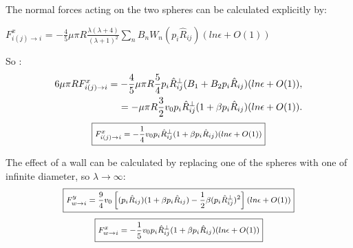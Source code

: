 \documentclass{article}
\begin{document}
The normal forces acting on the two spheres can be calculated explicitly by\cite{Brumley}:
\begin{center}
    $F_{i(j)\rightarrow i}^{x}$ = $-\frac{4}{5} \mu \pi R \frac{\lambda(\lambda +4)}{(\lambda +1)^2} \sum_{n} B_n W_n(p_i\hat{R}_{ij}) (ln \epsilon + O(1))$
\end{center}
 So :
\begin{align*}
    \footnotesize
    6\mu\pi RF_{i(j)\rightarrow i}^{x} = -\frac{4}{5}\mu\pi R\frac{5}{4}p_i\hat{R}^{\perp}_{ij}(B_1 + B_2 p_i\hat{R}_{ij})(ln \epsilon + O(1)),\\
    = -\mu\pi R\frac{3}{2}v_0p_i\hat{R}^{\perp}_{ij}(1 + \beta p_i\hat{R}_{ij})(ln \epsilon + O(1)).
\end{align*}
\begin{equation*}
    \footnotesize
    \boxed{F_{i(j)\rightarrow i}^{x} = -\frac{1}{4}v_0p_i\hat{R}^{\perp}_{ij}(1 + \beta p_i\hat{R}_{ij})(ln \epsilon + O(1))}
\end{equation*}

The effect of a wall can be calculated by replacing one of the spheres with one of infinite diameter, so $\lambda\rightarrow\infty$:
\begin{equation*}
    \footnotesize
    \boxed{F_{w\rightarrow i}^{y} = \frac{9}{4} v_0
    \left[(p_i\hat{R}_{ij})(1 + \beta p_i\hat{R}_{ij}) - \frac{1}{2}\beta(p_i\hat{R}^{\perp}_{ij})^2\right](ln \epsilon + O(1))}\\
\end{equation*}
\begin{equation*}
    \footnotesize
    \boxed{F_{w\rightarrow i}^{x} = -\frac{1}{5} v_0p_i\hat{R}^{\perp}_{ij}(1 + \beta p_i\hat{R}_{ij})(ln \epsilon + O(1))}
\end{equation*}
\end{document}
